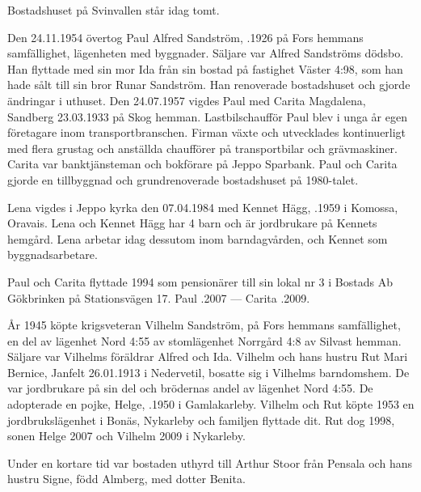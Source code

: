 Bostadshuset på Svinvallen står idag tomt.


Den 24.11.1954 övertog Paul Alfred Sandström, .1926 på Fors hemmans samfällighet, lägenheten med byggnader. Säljare var Alfred Sandströms dödsbo. Han flyttade med sin mor Ida från sin bostad på fastighet Väster 4:98, som han hade sålt till sin bror Runar Sandström. Han renoverade bostadshuset och gjorde ändringar i uthuset. Den 24.07.1957 vigdes Paul med Carita Magdalena, \textborn Sandberg 23.03.1933 på Skog hemman. Lastbilschaufför Paul blev i unga år egen företagare inom transportbranschen. Firman växte och utvecklades kontinuerligt med flera grustag och anställda chaufförer på transportbilar och grävmaskiner. Carita var banktjänsteman och bokförare på Jeppo Sparbank. Paul och Carita gjorde en tillbyggnad och grundrenoverade bostadshuset på 1980-talet.
\begin{jhchildren}
  \item {}
  \item {}
\end{jhchildren}
Lena vigdes i Jeppo kyrka den 07.04.1984 med Kennet Hägg, .1959 i Komossa, Oravais. Lena och Kennet Hägg har 4 barn och är jordbrukare på Kennets hemgård. Lena arbetar idag dessutom inom barndagvården, och Kennet som byggnadsarbetare.

Paul och Carita flyttade 1994 som pensionärer till sin lokal nr 3 i Bostads Ab Gökbrinken på Stationsvägen 17.
Paul .2007  ---  Carita .2009.


År 1945 köpte krigsveteran Vilhelm Sandström,  på Fors hemmans samfällighet, en del av lägenhet Nord 4:55 av stomlägenhet Norrgård 4:8 av Silvast hemman. Säljare var Vilhelms föräldrar Alfred och Ida. Vilhelm och hans hustru Rut Mari Bernice, \textborn Janfelt 26.01.1913 i Nedervetil, bosatte sig i Vilhelms barndomshem. De var jordbrukare på sin del och brödernas andel av lägenhet Nord 4:55. De adopterade en pojke, Helge, .1950 i Gamlakarleby. Vilhelm och Rut köpte 1953 en jordbrukslägenhet i Bonäs, Nykarleby och familjen flyttade dit. Rut dog 1998, sonen Helge 2007 och Vilhelm 2009 i Nykarleby.

Under en kortare tid var bostaden uthyrd till Arthur Stoor från Pensala och hans hustru Signe, född Almberg, med dotter Benita.


